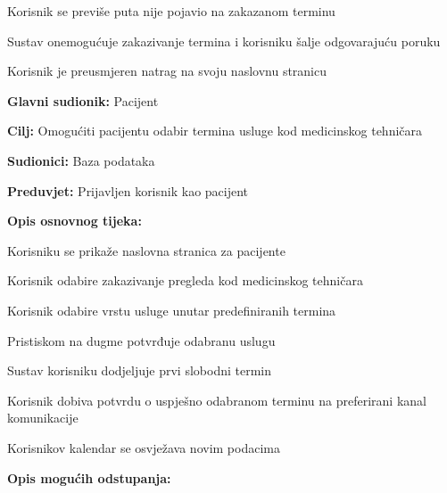 \begin{packed_item}
\begin{packed_item}
							\item[2.b] Korisnik se previše puta nije pojavio na zakazanom terminu
							\item[] \begin{packed_enum}
								
								\item Sustav onemogućuje zakazivanje termina i korisniku šalje odgovarajuću poruku
								\item Korisnik je preusmjeren natrag na svoju naslovnu stranicu
							\end{packed_enum}
						\end{packed_item}
					\end{packed_item}
					
					\noindent {}
					\begin{packed_item}
	
						\item \textbf{Glavni sudionik: }Pacijent
						\item  \textbf{Cilj:} Omogućiti pacijentu odabir termina usluge kod medicinskog tehničara
						\item  \textbf{Sudionici:} Baza podataka
						\item  \textbf{Preduvjet:} Prijavljen korisnik kao pacijent
						\item  \textbf{Opis osnovnog tijeka:}
						
						\item[] \begin{packed_enum}
	
							\item Korisniku se prikaže naslovna stranica za pacijente
							\item Korisnik odabire zakazivanje pregleda kod medicinskog tehničara
							\item Korisnik odabire vrstu usluge unutar predefiniranih termina
							\item Pristiskom na dugme potvrđuje odabranu uslugu
							\item Sustav korisniku dodjeljuje prvi slobodni termin
							\item Korisnik dobiva potvrdu o uspješno odabranom terminu na preferirani kanal komunikacije
							\item Korisnikov kalendar se osvježava novim podacima
						\end{packed_enum}
						
						\item  \textbf{Opis mogućih odstupanja:}
						

\end{packed_item}

